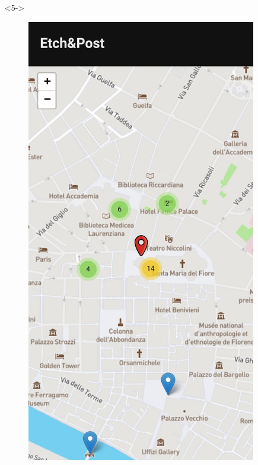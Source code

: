 \documentclass{beamer}
\begin{document}
\begin{frame}
\begin{columns}
\begin{itemize}
\end{itemize} 
\begin{itemize}
	\item[] <5-> 
		\begin{figure}[!h]
 			\centering
 			\includegraphics[scale=0.1]{"Immagini/Apertura.jpg"}
 		\end{figure}
\end{itemize}
\end{columns}
\end{frame}
\end{document}
